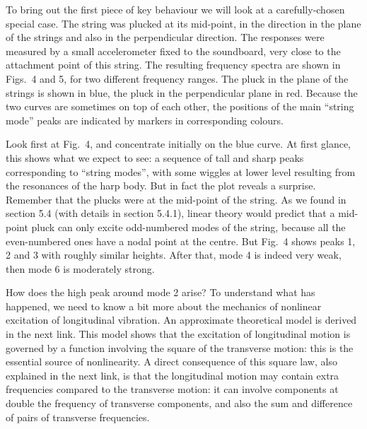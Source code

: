   To bring out the first piece of key behaviour we will look at a 
  carefully-chosen special case. The string was plucked at its mid-point, in 
  the direction in the plane of the strings and also in the perpendicular 
  direction. The responses were measured by a small accelerometer fixed to the 
  soundboard, very close to the attachment point of this string. The resulting 
  frequency spectra are shown in Figs.\ 4 and 5, for two different frequency 
  ranges. The pluck in the plane of the strings is shown in blue, the pluck in 
  the perpendicular plane in red. Because the two curves are sometimes on top 
  of each other, the positions of the main “string mode” peaks are indicated by 
  markers in corresponding colours. 

  Look first at Fig.\ 4, and concentrate initially on the blue curve. At first 
  glance, this shows what we expect to see: a sequence of tall and sharp peaks 
  corresponding to “string modes”, with some wiggles at lower level resulting 
  from the resonances of the harp body. But in fact the plot reveals a 
  surprise. Remember that the plucks were at the mid-point of the string. As we 
  found in section 5.4 (with details in section 5.4.1), linear theory would 
  predict that a mid-point pluck can only excite odd-numbered modes of the 
  string, because all the even-numbered ones have a nodal point at the centre. 
  But Fig.\ 4 shows peaks 1, 2 and 3 with roughly similar heights. After that, 
  mode 4 is indeed very weak, then mode 6 is moderately strong. 

  How does the high peak around mode 2 arise? To understand what has happened, 
  we need to know a bit more about the mechanics of nonlinear excitation of 
  longitudinal vibration. An approximate theoretical model is derived in the 
  next link. This model shows that the excitation of longitudinal motion is 
  governed by a function involving the square of the transverse motion: this is 
  the essential source of nonlinearity. A direct consequence of this square 
  law, also explained in the next link, is that the longitudinal motion may 
  contain extra frequencies compared to the transverse motion: it can involve 
  components at double the frequency of transverse components, and also the sum 
  and difference of pairs of transverse frequencies. 

